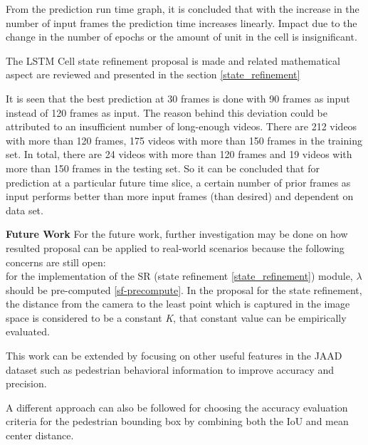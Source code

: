 From the prediction run time graph, it is concluded that with the increase in the number of input frames the prediction time increases linearly. Impact due to the change in the number of epochs or the amount of unit in the cell is insignificant.

The LSTM Cell state refinement proposal is made and related mathematical aspect are reviewed and presented in the section \ref{state_refinement}


It is seen that the best prediction at 30 frames is done with 90 frames as input instead of 120 frames as input. The reason behind this deviation could be attributed to an insufficient number of long-enough videos. There are 212 videos with more than 120 frames, 175 videos with more than 150 frames in the training set. In total, there are 24 videos with more than 120 frames and 19 videos with more than 150 frames in the testing set. So it can be concluded that for prediction at a particular future time slice, a certain number of prior frames as input performs better than more input frames (than desired) and dependent on data set.

\newpara

\textbf{Future Work}
For the future work, further investigation may be done on how resulted proposal can be applied to real-world scenarios because the following concerns are still open: \\
for the implementation of the SR (state refinement \ref{state_refinement}) module, $\lambda$ should be pre-computed \ref{sf-precompute}. In the proposal for the state refinement, the distance from the camera to the least point which is captured in the image space is considered to be a constant \textit{K}, that constant value can be empirically evaluated.

This work can be extended by focusing on other useful features in the JAAD dataset such as pedestrian behavioral information to improve accuracy and precision.

A different approach can also be followed for choosing the accuracy evaluation criteria for the pedestrian bounding box by combining both the IoU and mean center distance.
